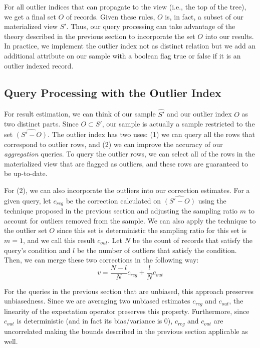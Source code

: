 For all outlier indices that can propagate to the view (i.e., the top of the tree), we get a final set $O$ of records. 
Given these rules, $O$ is, in fact, a subset of our materialized view $S'$.
Thus, our query processing can take advantage of the theory described in the previous section to incorporate the set $O$ into our results.
In practice, we implement the outlier index not as distinct relation but we add an additional attribute on our sample with a boolean flag true or false if it is an outlier indexed record.

\subsection{Query Processing with the Outlier Index} 
For result estimation, we can think of our sample $\hat{S'}$ and our outlier index $O$ as two distinct parts.
Since $O \subset S'$, our sample is actually a sample restricted to the set $\hat{(S'-O)}$. 
The outlier index has two uses: (1) we can query all the rows that correspond to outlier rows, 
and (2) we can improve the accuracy of our \emph{aggregation} queries.
To query the outlier rows, we can select all of the rows in the materialized view that are flagged as outliers, and these rows are guaranteed to be up-to-date.

For (2), we can also incorporate the outliers into our correction estimates.  
For a given query, let $c_{reg}$ be the correction calculated on $\hat{(S'-O)}$  using the technique proposed in the previous section and adjusting the sampling ratio $m$ to account for outliers removed from the sample.
We can also apply the technique to the outlier set $O$ since this set is deterministic the sampling ratio for this set is $m=1$, and we call this result $c_{out}$.
Let $N$ be the count of records that satisfy the query's condition and $l$ be the number of outliers that satisfy the condition.
Then, we can merge these two corrections in the following way:
\[
 v = \frac{N-l}{N}c_{reg} + \frac{l}{N}c_{out}
\]

For the queries in the previous section that are unbiased, this approach preserves unbiasedness.
Since we are averaging two unbiased estimates $c_{reg}$ and $c_{out}$, the linearity of the expectation operator preserves this property.
Furthermore, since $c_{out}$ is deterministic (and in fact its bias/variance is 0), $c_{reg}$ and $c_{out}$ are uncorrelated making the bounds described in the previous section applicable as well.

